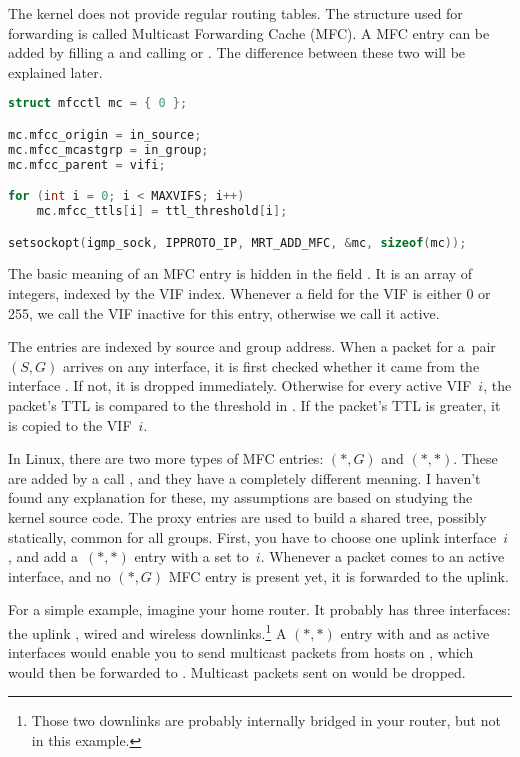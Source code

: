 The kernel does not provide regular routing tables. The structure used for
forwarding is called Multicast Forwarding Cache (MFC). A MFC entry can be added
by filling a  and calling  or
. The difference between these two will be
explained later.

\begin{lstlisting}[language=c]
struct mfcctl mc = { 0 };

mc.mfcc_origin = in_source;
mc.mfcc_mcastgrp = in_group;
mc.mfcc_parent = vifi;

for (int i = 0; i < MAXVIFS; i++)
    mc.mfcc_ttls[i] = ttl_threshold[i];

setsockopt(igmp_sock, IPPROTO_IP, MRT_ADD_MFC, &mc, sizeof(mc));
\end{lstlisting}

\noindent The basic meaning of an MFC entry is hidden in the field . It is
an array of  integers, indexed by the VIF index. Whenever a field for the VIF is
either 0 or 255, we call the VIF inactive for this entry, otherwise we call it
active.

The entries are indexed by source and group address. When a packet for a~pair $(S,G)$
arrives on any interface, it is first checked whether it came from the
interface . If not, it is dropped immediately. Otherwise
for every active VIF~$i$, the packet's TTL is compared to the threshold in
. If the packet's TTL is greater, it is copied to the
VIF~$i$.

In Linux, there are two more types of MFC entries: $(*,G)$ and $(*,*)$. These
are added by a call , and they have a completely different
meaning. I haven't found any explanation for these, my assumptions are based on
studying the kernel source code. The proxy entries are used to build a shared
tree, possibly statically, common for all groups. First, you have to choose one
uplink interface~$i$, and add a~$(*,*)$ entry with a  set
to~$i$. Whenever a packet comes to an active interface, and no $(*, G)$ MFC
entry is present yet, it is forwarded to the uplink.

For a simple example, imagine your home router. It probably has three
interfaces: the uplink , wired  and wireless
 downlinks.\footnote{Those two downlinks are probably internally
bridged in your router, but not in this example.} A $(*,*)$ entry with
 and  as active interfaces would enable you to send
multicast packets from hosts on , which would then be forwarded to
. Multicast packets sent on  would be dropped.

